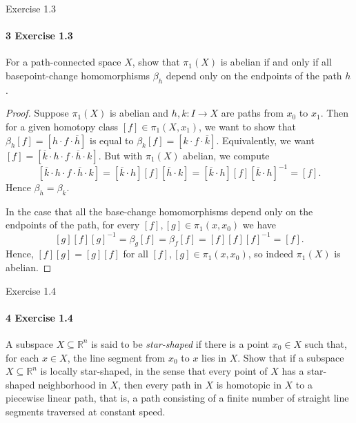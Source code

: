 \documentclass[12pt]{article}
\newlength{\myparskip}
\newenvironment{fullbox}{\begin{lrbox}{\savefullbox}\begin{minipage}{\dimexpr\textwidth-2\fboxsep\relax}\setlength{\parskip}{\myparskip}}{\end{minipage}\end{lrbox}\framebox[\textwidth]{\usebox{\savefullbox}}}
\newenvironment{pbox}[1][]{\begin{fullbox}\ifx#1\empty\else\paragraph{#1}\phantom{}\fi}{\end{fullbox}}
\theoremstyle{definition}
\newcommand{\R}{\mathbb{R}}
\newcommand{\<}{\langle}
\renewcommand{\>}{\rangle}
\newcommand{\seq}{\subseteq}
\begin{document}
\begin{pbox}[3 Exercise 1.3]
    For a path-connected space $X$, show that $\pi_1(X)$ is abelian if and only if all basepoint-change homomorphisms $\beta_h$ depend only on the endpoints of the path $h$.
\end{pbox}

\begin{proof}
    Suppose $\pi_1(X)$ is abelian and $h, k : I \to X$ are paths from $x_0$ to $x_1$.
    Then for a given homotopy class $[f] \in \pi_1(X, x_1)$, we want to show that $\beta_h[f] = [h \cdot f \cdot \overline{h}]$ is equal to $\beta_k[f] = [k \cdot f \cdot \overline{k}]$.
    Equivalently, we want $[f] = [\overline{k} \cdot h \cdot f \cdot \overline{h} \cdot k]$.
    But with $\pi_1(X)$ abelian, we compute
    \[
        [\overline{k} \cdot h \cdot f \cdot \overline{h} \cdot k]
            = [\overline{k} \cdot h] [f] [\overline{h} \cdot k]
            = [\overline{k} \cdot h] [f] [\overline{k} \cdot h]^{-1}
            = [f].
    \]
    Hence $\beta_h = \beta_k$.

    In the case that all the base-change homomorphisms depend only on the endpoints of the path, for every $[f], [g] \in \pi_1(x, x_0)$ we have
    \[
        [g][f][g]^{-1} = \beta_g[f] = \beta_f[f] = [f][f][f]^{-1} = [f].
    \]
    Hence, $[f][g] = [g][f]$ for all $[f], [g] \in \pi_1(x, x_0)$, so indeed $\pi_1(X)$ is abelian.
\end{proof}

\newpage
\begin{pbox}[4 Exercise 1.4]
    A subspace $X \seq \R^n$ is said to be \textit{star-shaped} if there is a point $x_0 \in X$ such that, for each $x \in X$, the line segment from $x_0$ to $x$ lies in $X$. 
    Show that if a subspace $X \seq \R^n$ is locally star-shaped, in the sense that every point of $X$ has a star-shaped neighborhood in $X$, then every path in $X$ is homotopic in $X$ to a piecewise linear path, that is, a path consisting of a finite number of straight line segments traversed at constant speed.
\end{pbox}
\end{document}
